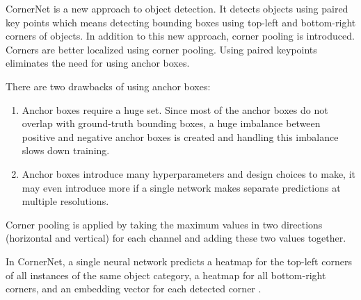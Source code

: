 \documentclass{article}
\begin{document}
\setlength{\parindent}{6ex}

\indent

CornerNet \cite{cornernetcite} is a new approach to object detection. It detects objects using 
paired key points which means detecting bounding boxes using top-left and bottom-right 
corners of objects. In addition to this new approach, corner pooling is introduced. 
Corners are better localized using corner pooling. Using paired keypoints eliminates 
the need for using anchor boxes. \par

There are two drawbacks of using anchor boxes: 
\begin{enumerate}
    \item Anchor boxes require a huge set. Since most of the anchor boxes do not 
    overlap with ground-truth bounding boxes, a huge imbalance between positive and 
    negative anchor boxes is created and handling this imbalance slows down training.
    \item Anchor boxes introduce many hyperparameters and design choices to make, 
    it may even introduce more if a single network makes separate predictions at 
    multiple resolutions.
\end{enumerate}
\indent

Corner pooling is applied by taking the maximum values in two directions (horizontal 
and vertical) for each channel and adding these two values together. \par

In CornerNet, a single neural network predicts a heatmap for the top-left corners 
of all instances of the same object category, a heatmap for all bottom-right 
corners, and an embedding vector for each detected corner \cite{cornernetcite}.
\end{document}
